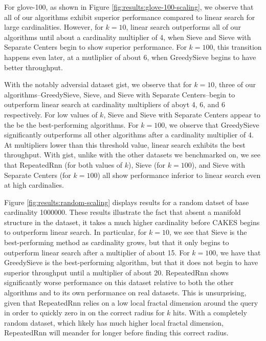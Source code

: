 For glove-100, as shown in Figure \ref{fig:results:glove-100-scaling}, we observe that all of our algorithms exhibit superior performance compared to linear search for large cardinalities. However, for $k=10$, linear search outperforms all of our algorithms until about a cardinality multiplier of 4, when Sieve and Sieve with Separate Centers begin to show superior performance. For $k=100$, this transition happens even later, at a mutliplier of about 6, when GreedySieve begins to have better throughput. 

With the notably adversial dataset gist, we observe that for $k=10$, three of our algorithms--GreedySieve, Sieve, and Sieve with Separate Centers--begin to outperform linear search at cardinality multipliers of aboyt 4, 6, and 6 respectively. 
For low values of $k$, Sieve and Sieve with Separate Centers appear to the be the best-performing algorithms. For $k=100$, we observe that GreedySieve significantly outperforms all other algorithms after a cardinality multiplier of 4. At multipliers lower than this threshold value, linear search exhibits the best throughput. With gist, unlike with the other datasets we benchmarked on, we see that RepeatedRnn (for both values of $k$), Sieve (for $k=100$), and Sieve with Separate Centers (for $k=100$) all show performance inferior to linear search even at high cardinalies. 

Figure \ref{fig:results:random-scaling} displays results for a random datset of base cardinality 1000000. 
These results illustrate the fact that absent a manifold structure in the dataset, it takes a much higher cardinality before CAKES begins to outperform linear search. 
In particular, for $k=10$, we see that Sieve is the best-performing method as cardinality grows, but that it only begins to outperform linear search after a multiplier of about 15. 
For $k=100$, we have that GreedySieve is the best-performing algorithm, but that it does not begin to have superior throughput until a multiplier of about 20. 
RepeatedRnn shows significantly worse performance on this dataset relative to both the other algorithms and to its own performance on real datasets. 
This is unsurprising, given that RepeatedRnn relies on a low local fractal dimension around the query in order to quickly zero in on the correct radius for $k$ hits. 
With a completely random dataset, which likely has much higher local fractal dimension, RepeatedRnn will meander for longer before finding this correct radius. 


